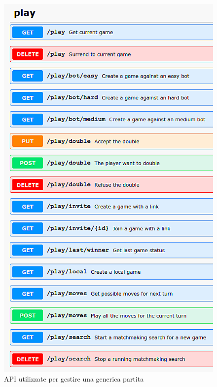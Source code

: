 \documentclass{article}
\begin{document}
\begin{figure}[H]
    \centering
    \begin{minipage}[t]{0.48\textwidth}
        \centering
        \includegraphics[width=\textwidth]{sw_overview}
        \caption{API utilizzate per gestire una generica partita}
        \label{fig:sw_overview}
    \end{minipage}
    \hfill
    \begin{minipage}[t]{0.49\textwidth}
        \centering

\end{minipage}
\end{figure}
\end{document}
